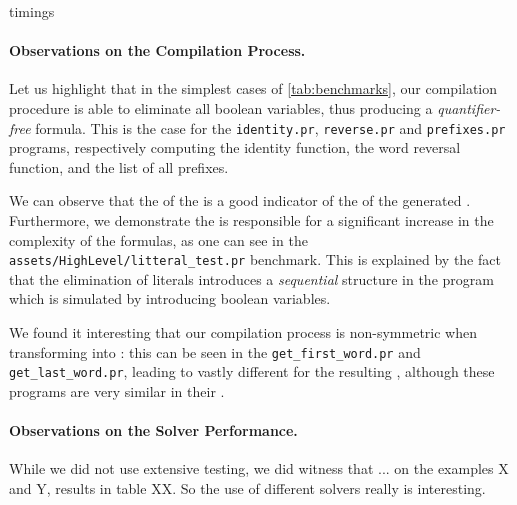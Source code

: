 \begin{table}
    \caption{timings}
    \label{tab:timings}
    \centering
    
\end{table}

\paragraph{Observations on the Compilation Process.} Let us highlight that in
the simplest cases of
\cref{tab:benchmarks},
our compilation procedure is able to eliminate all boolean variables, thus
producing a \emph{quantifier-free} formula. This is the case for the
\texttt{identity.pr}, \texttt{reverse.pr} and \texttt{prefixes.pr} programs,
respectively computing the identity function, the word reversal function, and
the list of all prefixes.

We can observe that the  of the  is a
good indicator of the  of the generated . Furthermore, we demonstrate the 
is responsible for a significant increase in the complexity of the formulas, as
one can see in the \texttt{assets/HighLevel/litteral\_test.pr} benchmark. This
is explained by the fact that the elimination of literals introduces a
\emph{sequential} structure in the program which is simulated by introducing
boolean variables.

We found it interesting that our compilation process is non-symmetric when
transforming  into : this
can be seen in the \texttt{get\_first\_word.pr} and
\texttt{get\_last\_word.pr}, leading to vastly different 
for the resulting , although these programs are
very similar in their .


\paragraph{Observations on the Solver Performance.} While we did not use
extensive testing, we did witness that ... on the examples X and Y, results in
table XX. So the use of different solvers really is interesting.


